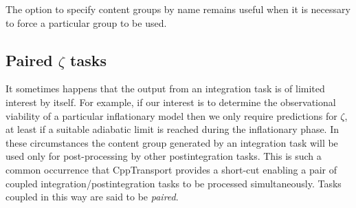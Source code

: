 \documentclass[11pt,a4paper]{article}
\newcommand{\packagefont}{\sffamily}
\newcommand{\CppTransport}{{\packagefont CppTransport}}
\begin{document}
The option to specify content groups by name remains useful
when it is necessary to force a particular group to be used.

\subsection{Paired $\zeta$ tasks}
It sometimes happens that the output from an integration task is of limited
interest by itself.
For example, if our interest is to determine the observational viability
of a particular
inflationary model then we only require predictions for $\zeta$,
at least if a suitable adiabatic limit is reached during the inflationary
phase.
In these circumstances
the content group generated by an integration task
will be used only for post-processing by other postintegration tasks.
This is such a common occurrence that {\CppTransport} provides a short-cut
enabling a pair of coupled integration/postintegration tasks
to be processed simultaneously.
Tasks coupled in this way are said to be \emph{paired}.
\end{document}
